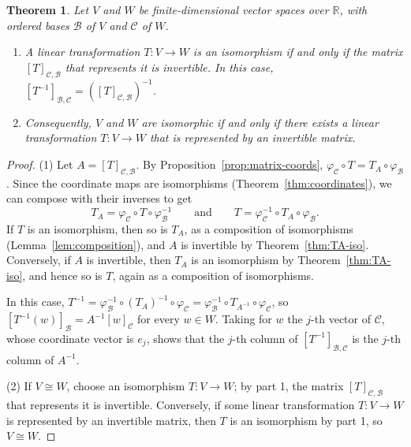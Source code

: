 \documentclass[11pt]{article}
\theoremstyle{definition}
\theoremstyle{plain}
\newtheorem{theorem}[definition]{Theorem}
\theoremstyle{remark}
\begin{document}
\begin{theorem}\label{thm:iso-matrix}
    Let $V$ and $W$ be finite-dimensional vector spaces over $\mathbb{R}$, with ordered bases $\mathcal{B}$ of $V$ and $\mathcal{C}$ of $W$.
    \begin{enumerate}
        \item A linear transformation $T: V \to W$ is an isomorphism if and only if the matrix $[T]_{\mathcal{C}, \mathcal{B}}$ that represents it is invertible. In this case, $[T^{-1}]_{\mathcal{B}, \mathcal{C}} = ([T]_{\mathcal{C}, \mathcal{B}})^{-1}$.
        \item Consequently, $V$ and $W$ are isomorphic if and only if there exists a linear transformation $T: V \to W$ that is represented by an invertible matrix.
    \end{enumerate}
\end{theorem}

\begin{proof}
    (1) Let $A = [T]_{\mathcal{C}, \mathcal{B}}$. By Proposition~\ref{prop:matrix-coords}, $\varphi_{\mathcal{C}} \circ T = T_A \circ \varphi_{\mathcal{B}}$. Since the coordinate maps are isomorphisms (Theorem~\ref{thm:coordinates}), we can compose with their inverses to get
    \[T_A = \varphi_{\mathcal{C}} \circ T \circ \varphi_{\mathcal{B}}^{-1} \qquad \text{and} \qquad T = \varphi_{\mathcal{C}}^{-1} \circ T_A \circ \varphi_{\mathcal{B}}.\]
    If $T$ is an isomorphism, then so is $T_A$, as a composition of isomorphisms (Lemma~\ref{lem:composition}), and $A$ is invertible by Theorem~\ref{thm:TA-iso}. Conversely, if $A$ is invertible, then $T_A$ is an isomorphism by Theorem~\ref{thm:TA-iso}, and hence so is $T$, again as a composition of isomorphisms.

    In this case, $T^{-1} = \varphi_{\mathcal{B}}^{-1} \circ (T_A)^{-1} \circ \varphi_{\mathcal{C}} = \varphi_{\mathcal{B}}^{-1} \circ T_{A^{-1}} \circ \varphi_{\mathcal{C}}$, so $[T^{-1}(w)]_{\mathcal{B}} = A^{-1} [w]_{\mathcal{C}}$ for every $w \in W$. Taking for $w$ the $j$-th vector of $\mathcal{C}$, whose coordinate vector is $e_j$, shows that the $j$-th column of $[T^{-1}]_{\mathcal{B}, \mathcal{C}}$ is the $j$-th column of $A^{-1}$.

    (2) If $V \cong W$, choose an isomorphism $T: V \to W$; by part 1, the matrix $[T]_{\mathcal{C}, \mathcal{B}}$ that represents it is invertible. Conversely, if some linear transformation $T: V \to W$ is represented by an invertible matrix, then $T$ is an isomorphism by part 1, so $V \cong W$.
\end{proof}
\end{document}
